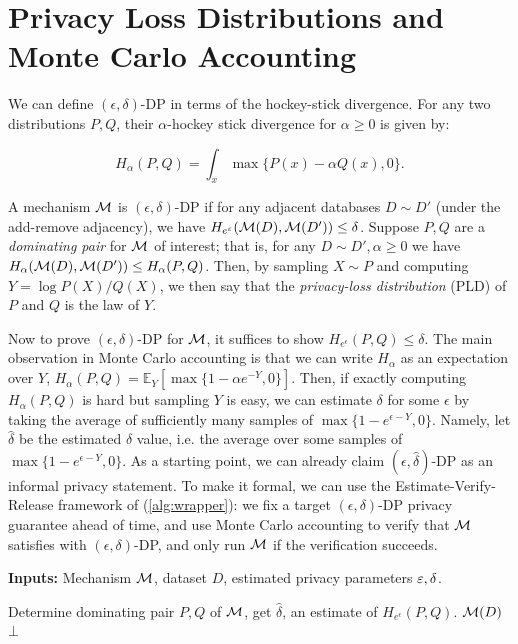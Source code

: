 \section{Privacy Loss Distributions and Monte Carlo Accounting}\label{sec:montecarlo}

We can define $(\epsilon, \delta)$-DP in terms of the hockey-stick divergence. For any two distributions $P, Q$, their $\alpha$-hockey stick divergence for $\alpha \geq 0$ is given by:

\[H_\alpha(P, Q) = \int_x \max\{P(x) - \alpha Q(x), 0\}.\]

A mechanism $\mathcal{M}$ is $(\epsilon, \delta)$-DP if for any adjacent databases $D \sim D'$ (under the add-remove adjacency), we have $H_{e^\varepsilon}(\mathcal{M}(D), \mathcal{M}(D')) \leq \delta$. Suppose $P, Q$ are a \textit{dominating pair} \citep{zhu22optimal} for $\mathcal{M}$ of interest; that is, for any $D \sim D', \alpha \geq 0$ we have $H_\alpha(\mathcal{M}(D), \mathcal{M}(D')) \leq H_\alpha(P, Q)$.
Then, by sampling $X \sim P$ and computing $Y = \log P(X)/Q(X)$, we then say that the \textit{privacy-loss distribution} (PLD) \citep{BBG18} of $P$ and $Q$ is the law of $Y$.

Now to prove $(\epsilon, \delta)$-DP for $\mathcal{M}$, it suffices to show $H_{e^\epsilon}(P, Q) \leq \delta$.
The main observation in Monte Carlo accounting is that we can write $H_\alpha$ as an expectation over $Y$, $H_\alpha(P, Q) = \mathbb{E}_Y [\max\{1 - \alpha e^{-Y}, 0\}]$.
Then, if exactly computing $H_\alpha(P, Q)$ is hard but sampling $Y$ is easy, we can estimate $\delta$ for some $\epsilon$ by taking the average of sufficiently many samples of $\max\{1 - e^{\epsilon-Y}, 0\}$. Namely, let $\hat{\delta}$ be the estimated $\delta$ value, i.e. the average over some samples of $\max\{1 - e^{\epsilon-Y}, 0\}$. As a starting point, we can already claim $(\epsilon, \hat{\delta})$-DP as an informal privacy statement. To make it formal, we can use 
the Estimate-Verify-Release framework of \citep{wang2023randomized} (\cref{alg:wrapper}): we fix a target $(\epsilon, \delta)$-DP privacy guarantee ahead of time, and use Monte Carlo accounting to verify that $\mathcal{M}$ satisfies with $(\epsilon, \delta)$-DP, and only run $\mathcal{M}$ if the verification succeeds.

\begin{algorithm}[htb]
\caption{Estimate-Verify-Release of \citep{wang2023randomized}} \label{alg:wrapper}
 \hspace*{\algorithmicindent} \textbf{Inputs:} Mechanism $\mathcal{M}$, dataset $D$, estimated privacy parameters $\varepsilon, \delta$.
\begin{algorithmic}[1]
\State Determine dominating pair $P, Q$ of $\mathcal{M}$, get $\hat{\delta}$, an estimate of $H_{e^\epsilon}(P, Q)$.
\If{$\hat{\delta} \leq \delta$}
\State \Return $\mathcal{M}(D)$
\Else
\State \Return $\bot$
\EndIf 
\end{algorithmic}
\end{algorithm}

